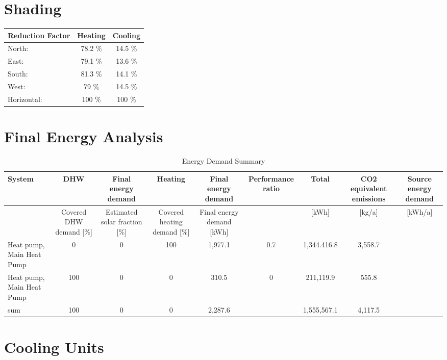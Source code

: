 \documentclass{article}
\begin{document}
\section*{Shading}
\begin{tabular}{@{}lcc@{}}
    \toprule
    \textbf{Reduction Factor} & \textbf{Heating} & \textbf{Cooling} \\ \midrule
    North:                    & 78.2 \%         & 14.5 \%          \\
    East:                     & 79.1 \%         & 13.6 \%          \\
    South:                    & 81.3 \%         & 14.1 \%          \\
    West:                     & 79 \%           & 14.5 \%          \\
    Horizontal:               & 100 \%          & 100 \%           \\
    \bottomrule
\end{tabular}


\section*{Final Energy Analysis}

\begin{table}[h]
    \centering
    \begin{tabular}{|l|c|c|c|c|c|c|c|c|}
        \hline
        \textbf{System} & \textbf{DHW} & \textbf{Final energy demand} & \textbf{Heating} & \textbf{Final energy demand} & \textbf{Performance ratio} & \textbf{Total} & \textbf{CO2 equivalent emissions} & \textbf{Source energy demand} \\
        \hline
        & Covered DHW demand [\%] & Estimated solar fraction [\%] & Covered heating demand [\%] & Final energy demand [kWh] &  & [kWh] & [kg/a] & [kWh/a] \\
        \hline
        Heat pump, Main Heat Pump & 0 & 0 & 100 & 1,977.1 & 0.7 & 1,344.416.8 & 3,558.7 &  \\
        \hline
        Heat pump, Main Heat Pump & 100 & 0 & 0 & 310.5 & 0 & 211,119.9 & 555.8 &  \\
        \hline
        sum & 100 & 0 & 0 & 2,287.6 &  & 1,555,567.1 & 4,117.5 &  \\
        \hline
    \end{tabular}
    \caption{Energy Demand Summary}
\end{table}

\section*{Cooling Units}
\end{document}
